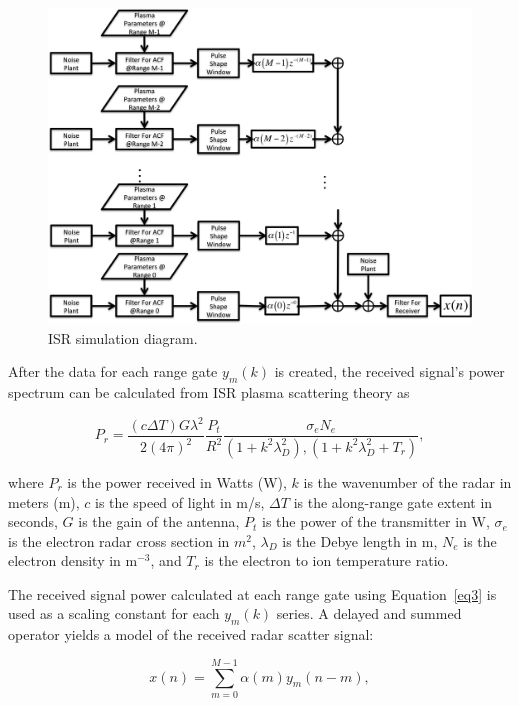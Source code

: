 \documentclass[draft,ras]{agutex}
\begin{document}
\begin{article}
\begin{figure}[!h]
\centering
\includegraphics[width=7.0in]{diagram}
\caption{ISR simulation diagram.}
\label{fig:isrdiag}
\end{figure}

After the data for each range gate $y_m(k)$ is created, the received signal's power spectrum can be calculated from ISR plasma scattering theory as 

\begin{equation}
\label{eq3}
P_r = \frac{\left(c\Delta T\right) G \lambda^2}{2(4\pi)^2}\frac{P_t }{R^2}\frac{\sigma_e N_e}{(1+k^2\lambda_D^2),(1+k^2\lambda_D^2 + T_r)},
\end{equation}
 
 \noindent where $P_r$ is the power received in Watts (W), $k$ is the wavenumber of the radar in meters (m), $c$ is the speed of light in m/s, $\Delta T$ is the along-range gate extent in seconds, $G$ is the gain of the antenna, $P_t$ is the power of the transmitter in W, $\sigma_e$ is the electron radar cross section in $m^2$,  $\lambda_D$ is the Debye length in m, $N_e$ is the electron density in m$^{-3}$, and $T_r$ is the electron to ion temperature ratio.
  
The received signal power calculated at each range gate using Equation~\ref{eq3} is used as a scaling constant for each $y_m(k)$ series.  A delayed and summed operator yields a model of the received radar scatter signal:
 
\begin{equation}
\label{eq4}
x(n) = \displaystyle\sum\limits_{m =0}^{M-1} \alpha(m)y_m(n-m),
\end{equation}


\end{article}
\end{document}
